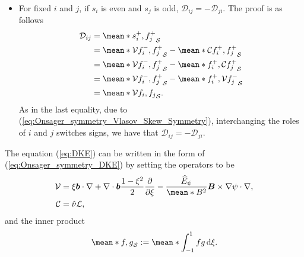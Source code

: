 \begin{itemize}
	\item For fixed $i$ and $j$, if $s_i$ is even and $s_j$ is odd, $\mathcal{D}_{ij} = -\mathcal{D}_{ji}$. The proof is as follows 
	\begin{align*}
		\mathcal{D}_{ij} & = \mean*{s_i^+, f_j^+}_{\mathcal{S}} \\
		& 
		= \mean*{\mathcal{V} f_i^-, f_j^+}_{\mathcal{S}}
		- \mean*{\mathcal{C} f_i^+, f_j^+}_{\mathcal{S}} \\
		& 
		= \mean*{\mathcal{V} f_i^-, f_j^+}_{\mathcal{S}}
		- \mean*{f_i^+, \mathcal{C}  f_j^+}_{\mathcal{S}} \\
		& 
		= \mean*{\mathcal{V} f_i^-, f_j^+}_{\mathcal{S}}
		- \mean*{f_i^+, \mathcal{V}  f_j^-}_{\mathcal{S}} \\
		& 
		= \mean*{\mathcal{V} f_i, f_j}_{\mathcal{S}}.
	\end{align*}
    As in the last equality, due to (\ref{eq:Onsager_symmetry_Vlasov_Skew_Symmetry}), interchanging the roles of $i$ and $j$ switches signs, we have that $\mathcal{D}_{ij} = -\mathcal{D}_{ji}$.

\end{itemize}

The equation (\ref{eq:DKE}) can be written in the form of (\ref{eq:Onsager_symmetry_DKE}) by setting
the operators to be
%
\begin{align}
	\mathcal{V} & = \xi \vb*{b}\cdot \nabla + \nabla\cdot\vb*{b} \frac{1-\xi^2}{2}\pdv{\xi}
	-  \frac{\widehat{E}_\psi}{\mean*{B^2}} \vb*{B}\times \nabla \psi \cdot \nabla,
	\\ 
	\mathcal{C} & = \hat{\nu} \Lorentz,
\end{align}
and the inner product
%
\begin{align}
	\mean*{f,g}_{\mathcal{S}}:= \mean*{\int_{-1}^{1}fg\dd{\xi}}.
	\label{eq:Onsager_Inner_Product}
\end{align}

